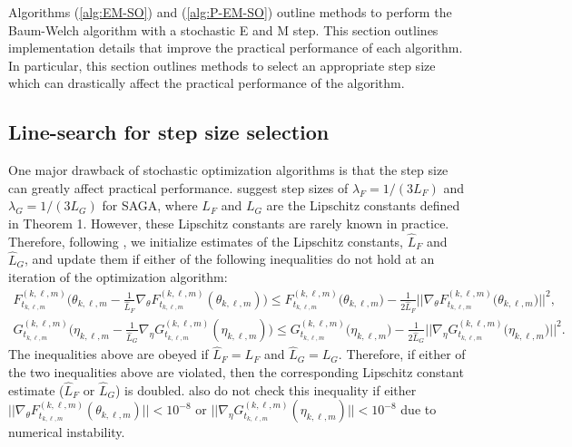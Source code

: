 
Algorithms (\ref{alg:EM-SO}) and (\ref{alg:P-EM-SO}) outline methods to perform the Baum-Welch algorithm with a stochastic E and M step. This section outlines implementation details that improve the practical performance of each algorithm. In particular, this section outlines methods to select an appropriate step size which can drastically affect the practical performance of the algorithm.

\subsection{Line-search for step size selection}
\label{subsec:est_L}

One major drawback of stochastic optimization algorithms is that the step size can greatly affect practical performance. %
\citet{Defazio:2014} suggest step sizes of $\lambda_F = 1/(3L_F)$ and $\lambda_G = 1/(3L_G)$ for SAGA, where $L_F$ and $L_G$ are the Lipschitz constants defined in Theorem 1. However, these Lipschitz constants are rarely known in practice. Therefore, following \citet{Schmidt:2017}, we initialize estimates of the Lipschitz constants, $\hat L_F$ and $\hat L_G$, and update them if either of the following inequalities do not hold at an iteration of the optimization algorithm:
%
\begin{gather}
    F^{(k,\ell,m)}_{t_{k,\ell,m}}\Big(\theta_{k,\ell,m} - \frac{1}{\hat L_F}\nabla_\theta F^{(k,\ell,m)}_{t_{k,\ell,m}}(\theta_{k,\ell,m})\Big) \leq F^{(k,\ell,m)}_{t_{k,\ell,m}}\Big(\theta_{k,\ell,m}\Big) - \frac{1}{2 \hat L_F} \Big| \Big| \nabla_\theta F^{(k,\ell,m)}_{t_{k,\ell,m}}\Big(\theta_{k,\ell,m}\Big) \Big| \Big| ^2,
    \label{ineq:F} \\
    G^{(k,\ell,m)}_{t_{k,\ell,m}}\Big(\eta_{k,\ell,m} - \frac{1}{\hat L_G}\nabla_\eta G^{(k,\ell,m)}_{t_{k,\ell,m}}(\eta_{k,\ell,m})\Big) \leq G^{(k,\ell,m)}_{t_{k,\ell,m}}\Big(\eta_{k,\ell,m}\Big) - \frac{1}{2 \hat L_G} \Big| \Big|  \nabla_\eta G^{(k,\ell,m)}_{t_{k,\ell,m}}\Big(\eta_{k,\ell,m}\Big) \Big| \Big|^2.
    \label{ineq:G}
\end{gather}
%
The inequalities above are obeyed if $\hat L_F = L_F$ and $\hat L_G = L_G$. Therefore, if either of the two inequalities above are violated, then the corresponding Lipschitz constant estimate ($\hat L_F$ or $\hat L_G$) is doubled. \citet{Schmidt:2017} also do not check this inequality if either $||\nabla_\theta F^{(k,\ell,m)}_{t_{k,\ell,m}}(\theta_{k,\ell,m})|| < 10^{-8}$ or $||\nabla_\eta G^{(k,\ell,m)}_{t_{k,\ell,m}}(\eta_{k,\ell,m})|| < 10^{-8}$ due to numerical instability. 

